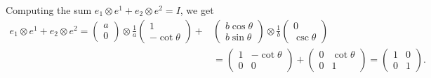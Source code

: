 \documentclass{../../templates/lkx_pset}
\begin{document}
\begin{parts}
	Computing the sum $e_1\otimes e^1 + e_2\otimes e^2 = I$, we get
	\[
		\begin{aligned}
			e_1\otimes e^1 + e_2\otimes e^2 =
			\begin{pmatrix} a\\0\end{pmatrix}\otimes \frac{1}{a}\begin{pmatrix}1\\ -\cot\theta\end{pmatrix} + &
			\begin{pmatrix} b\cos\theta\\ b\sin \theta\end{pmatrix}\otimes \frac{1}{b}\begin{pmatrix}0\\ \csc\theta\end{pmatrix}                    \\
			                                                                                                  & =\begin{pmatrix}
				                                                                                                     1 & -\cot\theta \\0&0
			                                                                                                     \end{pmatrix} +\begin{pmatrix}
				                                                                                                                    0 & \cot\theta \\0&1
			                                                                                                                    \end{pmatrix}
			= \begin{pmatrix}1&0\\0&1\end{pmatrix}.
		\end{aligned}
	\]
\end{parts}
\end{document}
